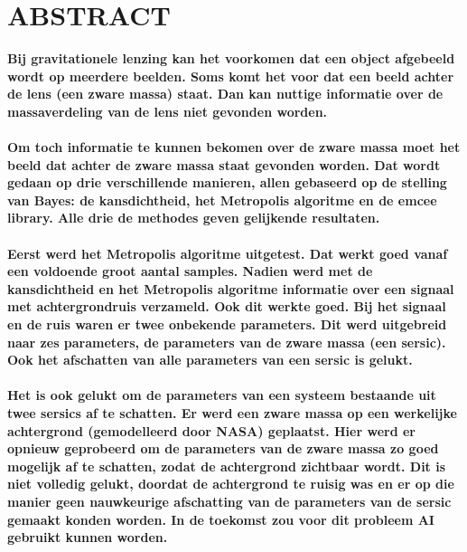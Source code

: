 \section*{ABSTRACT}
\textbf{Bij gravitationele lenzing kan het voorkomen dat een object afgebeeld wordt op meerdere beelden. Soms komt het voor dat een beeld achter de lens (een zware massa) staat. Dan kan nuttige informatie over de massaverdeling van de lens niet gevonden worden.\\ \\
Om toch informatie te kunnen bekomen over de zware massa moet het beeld dat achter de zware massa staat gevonden worden. Dat wordt gedaan op drie verschillende manieren, allen gebaseerd op de stelling van Bayes: de kansdichtheid, het Metropolis algoritme en de emcee library. Alle drie de methodes geven gelijkende resultaten. \\ \\
Eerst werd het Metropolis algoritme uitgetest. Dat werkt goed vanaf een voldoende groot aantal samples. Nadien werd met de kansdichtheid en het Metropolis algoritme informatie over een signaal met achtergrondruis verzameld. Ook dit werkte goed. Bij het signaal en de ruis waren er twee onbekende parameters. Dit werd uitgebreid naar zes parameters, de parameters van de zware massa (een sersic). Ook het afschatten van alle parameters van een sersic is gelukt. \\ \\
Het is ook gelukt om de parameters van een systeem bestaande uit twee sersics af te schatten. Er werd een zware massa op een werkelijke achtergrond (gemodelleerd door NASA) geplaatst. Hier werd er opnieuw geprobeerd om de parameters van de zware massa zo goed mogelijk af te schatten, zodat de achtergrond zichtbaar wordt. Dit is niet volledig gelukt, doordat de achtergrond te ruisig was en er op die manier geen nauwkeurige afschatting van de parameters van de sersic gemaakt konden worden. In de toekomst zou voor dit probleem AI gebruikt kunnen worden.}